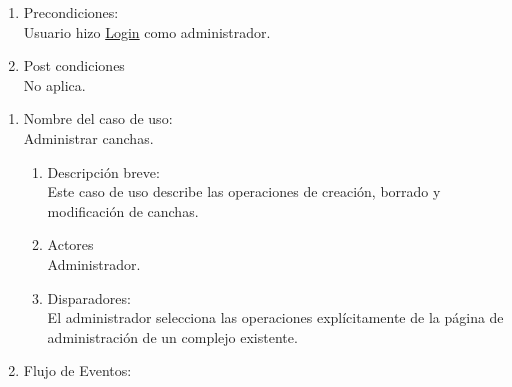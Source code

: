 \documentclass[a4paper,11pt]{article}
\begin{document}
\begin{enumerate}
    \item Precondiciones: \\
        Usuario hizo \underline{Login} como administrador.

    \item Post condiciones \\
        No aplica.

\end{enumerate}


\begin{enumerate}

    \item Nombre del caso de uso: \\
    Administrar canchas.

    \begin{enumerate}
    \item Descripción breve: \\
        Este caso de uso describe las operaciones de creación, borrado y
        modificación de canchas.
    \item Actores \\
        Administrador.
    \item Disparadores: \\
        El administrador selecciona las operaciones explícitamente de la página
        de administración de un complejo existente.
    \end{enumerate}

    \item Flujo de Eventos: \\

    \begin{enumerate}


\end{enumerate}
\end{enumerate}
\end{document}
